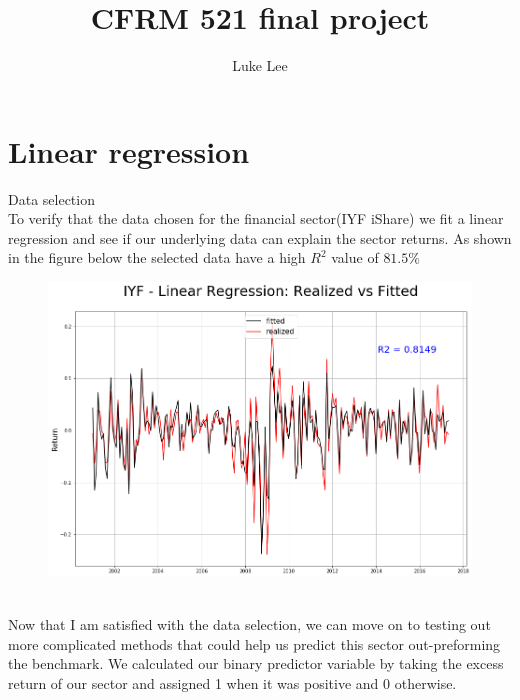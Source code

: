 \documentclass[]{scrartcl}
\begin{document}
\title{CFRM 521 final project\\}
\author{Luke Lee}
\maketitle

\section*{Linear regression} 
Data selection  
\\
To verify that the data chosen for the financial sector(IYF iShare) we fit a linear regression and see if our underlying data can explain the sector returns. As shown in the figure below the selected data have a high $R^2$ value of $81.5 \%$
\begin{figure}[htb]
	\includegraphics[scale=0.5]{linear_regression_additional_data.png}
\end{figure}
\\
Now that I am satisfied with the data selection, we can move on to testing out more complicated methods that could help us predict this sector out-preforming the benchmark. We calculated our binary predictor variable by taking the excess return of our sector and assigned 1 when it was positive and 0 otherwise.
\\
\end{document}
